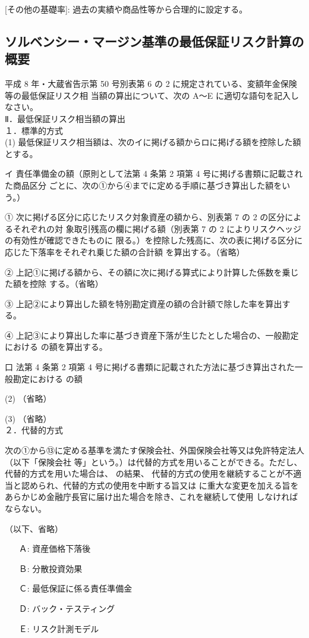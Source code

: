 \documentclass[report,gutter=10mm,fore-edge=10mm,uplatex,dvipdfmx]{jlreq}
\begin{document}
{[その他の基礎率]: 過去の実績や商品性等から合理的に設定する。

\subsection{ソルベンシー・マージン基準の最低保証リスク計算の概要}
平成 8 年・大蔵省告示第 50 号別表第 6 の 2 に規定されている、変額年金保険等の最低保証リスク相
当額の算出について、次の A～E に適切な語句を記入しなさい。\\
Ⅱ．最低保証リスク相当額の算出\\
１．標準的方式\\
(1) 最低保証リスク相当額は、次のイに掲げる額からロに掲げる額を控除した額とする。

イ  責任準備金の額（原則として法第 4 条第 2 項第 4 号に掲げる書類に記載された商品区分
ごとに、次の①から④までに定める手順に基づき算出した額をいう。）

① 次に掲げる区分に応じたリスク対象資産の額から、別表第 7 の 2 の区分によるそれぞれの対
象取引残高の欄に掲げる額（別表第 7 の 2 によりリスクヘッジの有効性が確認できたものに
限る。）を控除した残高に、次の表に掲げる区分に応じた下落率をそれぞれ乗じた額の合計額
を算出する。（省略）

② 上記①に掲げる額から、その額に次に掲げる算式により計算した係数を乗じた額を控除
する。（省略）

③ 上記②により算出した額を特別勘定資産の額の合計額で除した率を算出する。

④ 上記③により算出した率に基づき資産下落が生じたとした場合の、一般勘定における
の額を算出する。

口 法第 4 条第 2 項第 4 号に掲げる書類に記載された方法に基づき算出された一般勘定における
の額

(2) （省略）

(3) （省略）\\
２．代替的方式

次の①から⑬に定める基準を満たす保険会社、外国保険会社等又は免許特定法人（以下「保険会社
等」という。）は代替的方式を用いることができる。ただし、代替的方式を用いた場合は、
の結果、
代替的方式の使用を継続することが不適当と認められ、代替的方式の使用を中断する旨又は
に重大な変更を加える旨をあらかじめ金融庁長官に届け出た場合を除き、これを継続して使用
しなければならない。

（以下、省略）
\answer{}
\begin{itemize}
 \item[Ａ: ] 資産価格下落後
 \item[Ｂ: ] 分散投資効果
 \item[Ｃ: ] 最低保証に係る責任準備金
 \item[Ｄ: ] バック・テスティング
 \item[Ｅ: ] リスク計測モデル
\end{itemize}
}
\end{document}

